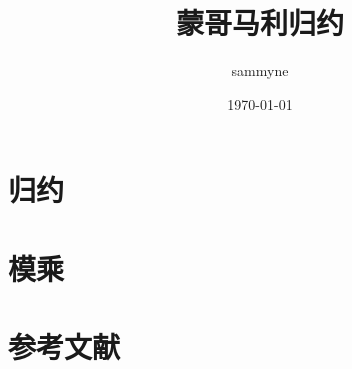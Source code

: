 \documentclass[a4paper,10pt]{article}
\title{蒙哥马利归约}
\author{sammyne}
\date{\today}
\begin{document}
  \maketitle

\section{归约}


\section{模乘}


\section{参考文献}

\end{document}
